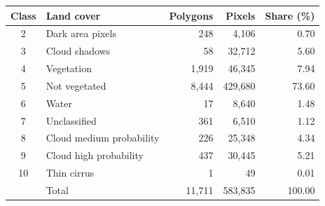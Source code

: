 \begin{tabular}{clrrr}
\toprule
Class & Land cover & Polygons & Pixels & Share (\%) \\
\midrule
2 & Dark area pixels & 248 & 4,106 & 0.70 \\
3 & Cloud shadows & 58 & 32,712 & 5.60 \\
4 & Vegetation & 1,919 & 46,345 & 7.94 \\
5 & Not vegetated & 8,444 & 429,680 & 73.60 \\
6 & Water & 17 & 8,640 & 1.48 \\
7 & Unclassified & 361 & 6,510 & 1.12 \\
8 & Cloud medium probability & 226 & 25,348 & 4.34 \\
9 & Cloud high probability & 437 & 30,445 & 5.21 \\
10 & Thin cirrus & 1 & 49 & 0.01 \\
\midrule
 & Total & 11,711 & 583,835 & 100.00 \\
\bottomrule
\end{tabular}
